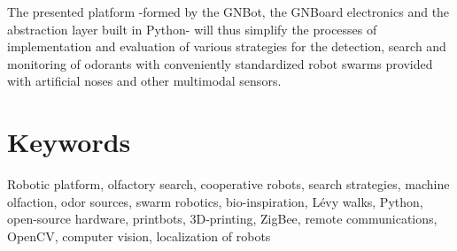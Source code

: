 The presented platform -formed by the GNBot, the GNBoard electronics and the abstraction layer built in Python- will thus simplify the processes of implementation and evaluation of various strategies for the detection, search and monitoring of odorants with conveniently standardized robot swarms provided with artificial noses and other multimodal sensors.

\vspace*{-0.2cm}
\section*{Keywords}
\vspace*{-0.2cm}
Robotic platform, olfactory search, cooperative robots, search strategies, machine olfaction, odor sources, swarm robotics, bio-inspiration, L\'{e}vy walks, Python, open-source hardware, printbots, 3D-printing, ZigBee, remote communications, OpenCV, computer vision, localization of robots

